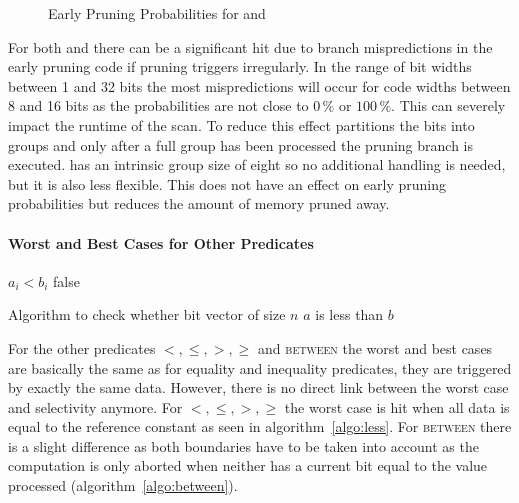 \begin{figure}[h] \center
{}
\caption{Early Pruning Probabilities for \bwv{} and \bs{}}
\label{fig:earlypruningprobabilities}
\end{figure}

For both \bwv{} and \bs{} there can be a significant hit due to branch
mispredictions in the early pruning code if pruning triggers irregularly. In the
range of bit widths between 1 and 32 bits the most mispredictions will occur for
code widths between 8 and 16 bits as the probabilities are not close to $0\,\%$
or $100\,\%$. This can severely impact the runtime of the scan.  To
reduce this effect \bwv{} partitions the bits into groups and only after a full
group has been processed the pruning branch is executed. \bs{} has an intrinsic
group size of eight so no additional handling is needed, but it is also less
flexible. This does not have an effect on early pruning probabilities but
reduces the amount of memory pruned away.

\paragraph{Worst and Best Cases for Other Predicates}

\begin{algorithm}[h]
\begin{algorithmic}[1]
        \State \Return $a_i < b_i$
      \EndIf
    \EndFor
    \State \Return false
  \EndProcedure
\end{algorithmic}
\caption{Algorithm to check whether bit vector of size $n$ $a$ is less than $b$}
\label{algo:less}
\end{algorithm}

For the other predicates $<,\le,>,\ge$ and \textsc{between} the worst and best
cases are basically the same as for equality and inequality predicates, they are
triggered by exactly the same data.  However, there is no direct link between
the worst case and selectivity anymore. For $<,\le,>,\ge$ the worst case is hit
when all data is equal to the reference constant as seen in
algorithm~\ref{algo:less}. For \textsc{between} there is a slight difference as
both boundaries have to be taken into account as the computation is only aborted
when neither has a current bit equal to the value processed
(algorithm~\ref{algo:between}).

